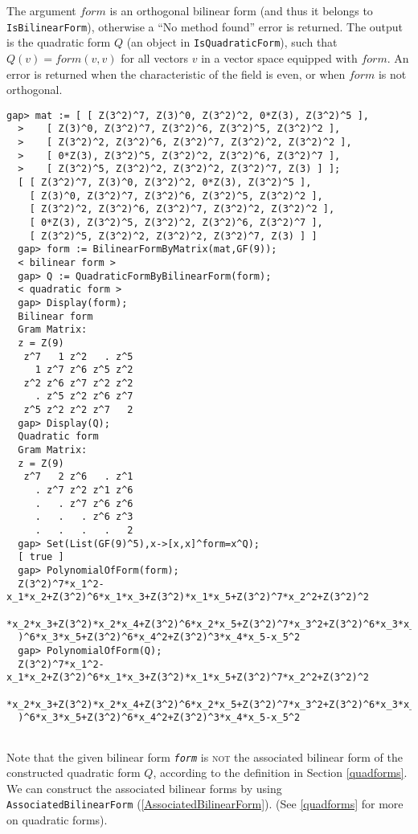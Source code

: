 \documentclass[a4paper,11pt]{report}
\begin{document}
{{{The argument $form$ is an orthogonal bilinear form (and thus it belongs to \texttt{IsBilinearForm}), otherwise a ``No method found'' error is returned. The output is the
quadratic form $Q$ (an object in \texttt{IsQuadraticForm}), such that $Q(v) = form(v,v)$ for all vectors $v$ in a vector space equipped with $form$. An error is returned when the characteristic of the field is even, or when $form$ is not orthogonal. 
\begin{Verbatim}[fontsize=\small,frame=single,label=Example]
  gap> mat := [ [ Z(3^2)^7, Z(3)^0, Z(3^2)^2, 0*Z(3), Z(3^2)^5 ], 
  >    [ Z(3)^0, Z(3^2)^7, Z(3^2)^6, Z(3^2)^5, Z(3^2)^2 ], 
  >    [ Z(3^2)^2, Z(3^2)^6, Z(3^2)^7, Z(3^2)^2, Z(3^2)^2 ], 
  >    [ 0*Z(3), Z(3^2)^5, Z(3^2)^2, Z(3^2)^6, Z(3^2)^7 ], 
  >    [ Z(3^2)^5, Z(3^2)^2, Z(3^2)^2, Z(3^2)^7, Z(3) ] ];
  [ [ Z(3^2)^7, Z(3)^0, Z(3^2)^2, 0*Z(3), Z(3^2)^5 ], 
    [ Z(3)^0, Z(3^2)^7, Z(3^2)^6, Z(3^2)^5, Z(3^2)^2 ], 
    [ Z(3^2)^2, Z(3^2)^6, Z(3^2)^7, Z(3^2)^2, Z(3^2)^2 ], 
    [ 0*Z(3), Z(3^2)^5, Z(3^2)^2, Z(3^2)^6, Z(3^2)^7 ], 
    [ Z(3^2)^5, Z(3^2)^2, Z(3^2)^2, Z(3^2)^7, Z(3) ] ]
  gap> form := BilinearFormByMatrix(mat,GF(9));
  < bilinear form >
  gap> Q := QuadraticFormByBilinearForm(form);
  < quadratic form >
  gap> Display(form);
  Bilinear form
  Gram Matrix:
  z = Z(9)
   z^7   1 z^2   . z^5
     1 z^7 z^6 z^5 z^2
   z^2 z^6 z^7 z^2 z^2
     . z^5 z^2 z^6 z^7
   z^5 z^2 z^2 z^7   2
  gap> Display(Q);
  Quadratic form
  Gram Matrix:
  z = Z(9)
   z^7   2 z^6   . z^1
     . z^7 z^2 z^1 z^6
     .   . z^7 z^6 z^6
     .   .   . z^6 z^3
     .   .   .   .   2
  gap> Set(List(GF(9)^5),x->[x,x]^form=x^Q);
  [ true ]
  gap> PolynomialOfForm(form);
  Z(3^2)^7*x_1^2-x_1*x_2+Z(3^2)^6*x_1*x_3+Z(3^2)*x_1*x_5+Z(3^2)^7*x_2^2+Z(3^2)^2
  *x_2*x_3+Z(3^2)*x_2*x_4+Z(3^2)^6*x_2*x_5+Z(3^2)^7*x_3^2+Z(3^2)^6*x_3*x_4+Z(3^2
  )^6*x_3*x_5+Z(3^2)^6*x_4^2+Z(3^2)^3*x_4*x_5-x_5^2
  gap> PolynomialOfForm(Q);
  Z(3^2)^7*x_1^2-x_1*x_2+Z(3^2)^6*x_1*x_3+Z(3^2)*x_1*x_5+Z(3^2)^7*x_2^2+Z(3^2)^2
  *x_2*x_3+Z(3^2)*x_2*x_4+Z(3^2)^6*x_2*x_5+Z(3^2)^7*x_3^2+Z(3^2)^6*x_3*x_4+Z(3^2
  )^6*x_3*x_5+Z(3^2)^6*x_4^2+Z(3^2)^3*x_4*x_5-x_5^2
   
\end{Verbatim}
 Note that the given bilinear form \mbox{\texttt{\slshape form}} is \textsc{not} the associated bilinear form of the constructed quadratic form $Q$, according to the definition in Section \ref{quadforms}. We can construct the associated bilinear forms by using \texttt{AssociatedBilinearForm} (\ref{AssociatedBilinearForm}). (See \ref{quadforms} for more on quadratic forms). }

}}
\end{document}
